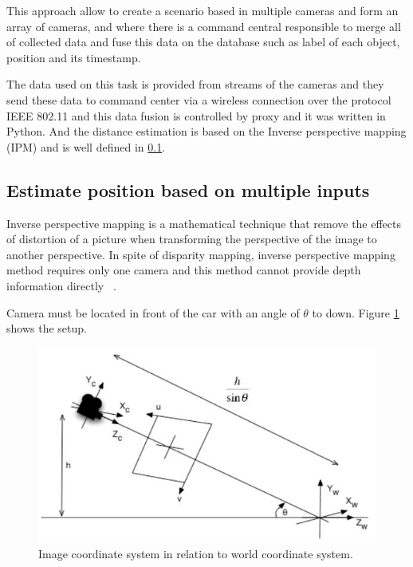 This approach allow to create a scenario based in multiple cameras and form an array of cameras, and where there is a command central responsible to merge all of collected data and fuse this data on the database such as label of each object, position and its timestamp. 

The data used on this task is provided from streams of the cameras and they send these data to command center via a wireless connection over the protocol IEEE 802.11 and this data fusion is controlled by proxy and it was written in Python. And the distance estimation is based on the Inverse perspective mapping (IPM) and is well defined in \ref{ipm}.


\subsection{Estimate position based on multiple inputs}\label{ipm}
Inverse perspective mapping is a mathematical technique that remove the effects of distortion of a picture when transforming the perspective of the image to another perspective. In spite of disparity mapping, inverse perspective mapping method requires only one camera and this method cannot provide depth information directly ~\cite{Tuohy2010}.

Camera must be located in front of the car with an angle of \(\theta\) to down. Figure \ref{fig:ImageRelationSystem} shows the setup.

\begin{figure}[h]
\centering
\includegraphics[scale=0.5]{imagens/Inverse Perspective Mapping.JPG}
\caption{Image coordinate system in relation to world coordinate
system.}
\label{fig:ImageRelationSystem}
\end{figure}
\par


